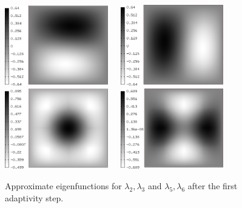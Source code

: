\documentclass[preprint,12pt]{elsarticle}
\begin{document}
\clearpage
\begin{figure}[!ht]
\begin{center}
\includegraphics[width=0.4\textwidth]{img/eigen_5.png}\ \ \ 
\includegraphics[width=0.4\textwidth]{img/eigen_6.png}\\[4mm]
\includegraphics[width=0.4\textwidth]{img/eigen_7.png}\ \ \ 
\includegraphics[width=0.4\textwidth]{img/eigen_8.png}\\
\end{center}
\vspace{-5mm}
\caption{Approximate eigenfunctions for $\lambda_2, \lambda_3$ and 
$\lambda_5, \lambda_6$ after the first adaptivity step.}
\label{fig:eigen2}
\end{figure}
\end{document}
